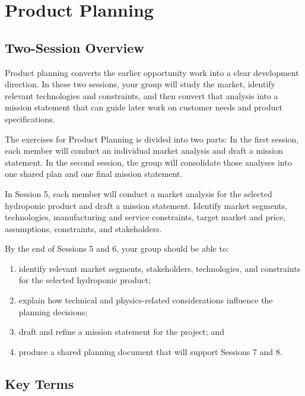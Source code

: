 \chapter{Product Planning}

\section{Two-Session Overview}

Product planning converts the earlier opportunity work into a clear development direction. In these two sessions, your group will study the market, identify relevant technologies and constraints, and then convert that analysis into a mission statement that can guide later work on customer needs and product specifications.

The exercises for Product Planning is divided into two parts: In the first session, each member will conduct an individual market analysis and draft a mission statement. In the second session, the group will consolidate those analyses into one shared plan and one final mission statement.

\begin{tcolorbox}[title=Goal]
In Session 5, each member will conduct a market analysis for the selected hydroponic product and draft a mission statement. Identify market segments, technologies, manufacturing and service constraints, target market and price, assumptions, constraints, and stakeholders.
\end{tcolorbox}

By the end of Sessions 5 and 6, your group should be able to:
\begin{enumerate}
    \item identify relevant market segments, stakeholders, technologies, and constraints for the selected hydroponic product;
    \item explain how technical and physics-related considerations influence the planning decisions;
    \item draft and refine a mission statement for the project; and
    \item produce a shared planning document that will support Sessions 7 and 8.
\end{enumerate}

\section{Key Terms}

